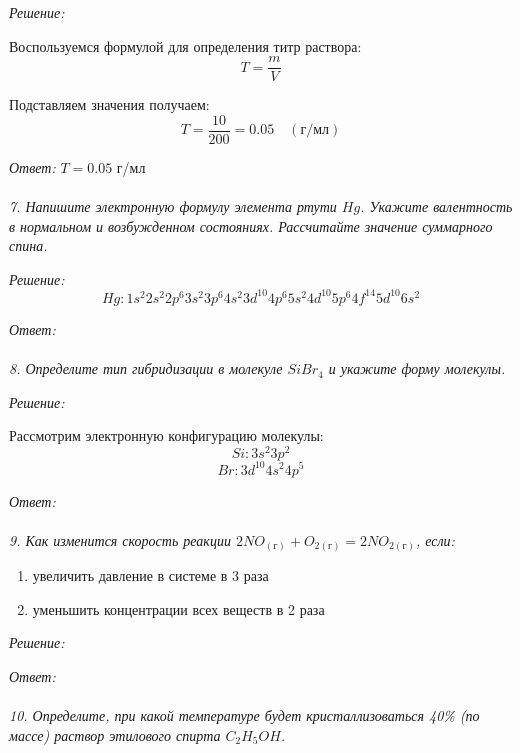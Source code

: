 \emph{Решение:}

Воспользуемся формулой для определения титр раствора:
\[
	T = \frac{m}{V}
\]

Подставляем значения получаем:
\[
	T = \frac{10}{200} = 0.05 \quad(\text{г/мл})
\]

\emph{Ответ: } \( T = 0.05 \) г/мл \\\\


\emph{7. Напишите электронную формулу элемента ртути \( Hg \). Укажите 
валентность в нормальном и возбужденном состояниях. Рассчитайте значение 
суммарного спина.}

\emph{Решение:}
\[
	Hg: 1s^2 2s^2 2p^6 3s^2 3p^6 4s^2 3d^{10} 4p^6 5s^2 4d^{10} 5p^6
        4f^{14} 5d^{10} 6s^2
\]

\emph{Ответ: } \\\\


\emph{8. Определите тип гибридизации в молекуле \( SiBr_4 \) и укажите 
форму молекулы.}

\emph{Решение:}

Рассмотрим электронную конфигурацию молекулы:
\[ Si: 3s^2 3p^2 \]
\[ Br: 3d^10 4s^2 4p^5 \]

\emph{Ответ: } \\\\


\emph{9. Как изменится скорость реакции 
\( 2NO_{(\text{г})} + O_{2(\text{г})} = 2NO_{2(\text{г})} \), если:}
\begin{enumerate}
    \item увеличить давление в системе в 3 раза
    \item уменьшить концентрации всех веществ в 2 раза
\end{enumerate}

\emph{Решение:}

\emph{Ответ: } \\\\


\emph{10. Определите, при какой температуре будет кристаллизоваться 40\% 
(по массе) раствор этилового спирта \( C_2H_5OH \).}

